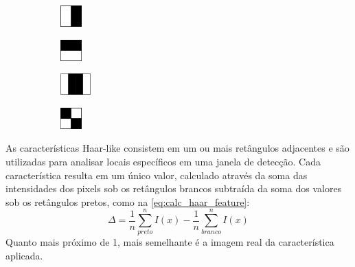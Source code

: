 \begin{figure}[htbp]
    \centering
    \caption{Características Haar-like}
    \label{fig:haar_like_features}
    \begin{subfigure}[t]{0.2\textwidth}
    \centering
    \includegraphics{imagens/haar_like_features1.png}
    \caption{}\label{fig:haar_like_features:a}
    \end{subfigure}
    \begin{subfigure}[t]{0.2\textwidth}
    \centering
    \includegraphics{imagens/haar_like_features2.png}
    \caption{}\label{fig:haar_like_features:b}
    \end{subfigure}
    \begin{subfigure}[t]{0.2\textwidth}
    \centering
    \includegraphics{imagens/haar_like_features3.png}
    \caption{}\label{fig:haar_like_features:c}
    \end{subfigure}
    \begin{subfigure}[t]{0.2\textwidth}
    \centering
    \includegraphics{imagens/haar_like_features4.png}
    \caption{}\label{fig:haar_like_features:d}
    \end{subfigure}
\end{figure}

As características Haar-like consistem em um ou mais retângulos adjacentes e são utilizadas para analisar locais específicos em uma janela de detecção. Cada característica resulta em um único valor, calculado através da soma das intensidades dos pixels sob os retângulos brancos subtraída da soma dos valores sob os retângulos pretos, como na \autoref{eq:calc_haar_feature}:
%
\begin{equation} \label{eq:calc_haar_feature}
\Delta = \frac{1}{n}  \sum_{preto}^{n} I(x) - \frac{1}{n}  \sum_{branco}^{n} I(x)
\end{equation}
%
Quanto mais próximo de 1, mais semelhante é a imagem real da característica aplicada.


